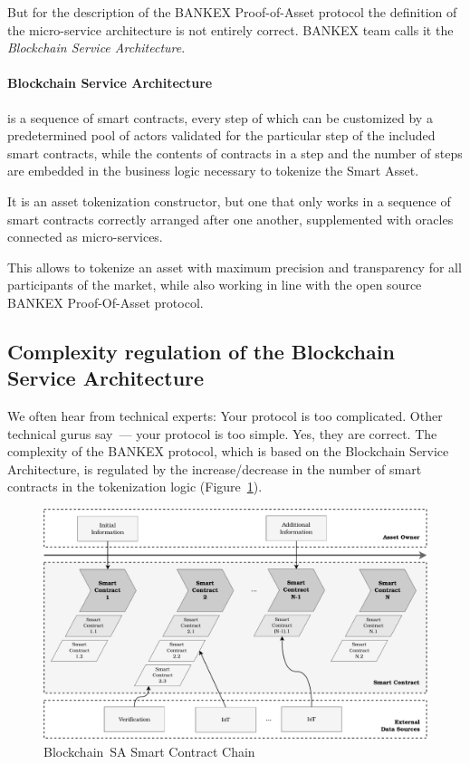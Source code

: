 \documentclass{article}
\begin{document}
\begin{multicols}{2}
But for the description of the BANKEX Proof-of-Asset protocol the definition of the micro-service architecture is not entirely correct. BANKEX team calls it the \textit{Blockchain Service Architecture}.

\paragraph*{Blockchain Service Architecture} is a sequence of smart contracts, every step of which can be customized by a predetermined pool of actors validated for the particular step of the included smart contracts, while the contents of contracts in a step and the number of steps are embedded in the business logic necessary to tokenize the Smart Asset.

It is an asset tokenization constructor, but one that only works in a sequence of smart contracts correctly arranged after one another, supplemented with oracles connected as micro-services. 

This allows to tokenize an asset with maximum precision and transparency for all participants of the market, while also working in line with the open source BANKEX Proof-Of-Asset protocol. 

\subsection{Complexity regulation of the Blockchain Service Architecture}

We often hear from technical experts: Your protocol is too complicated. Other technical gurus say~--- your protocol is too simple. Yes, they are correct. The complexity of the BANKEX protocol, which is based on the Blockchain Service Architecture, is regulated by the increase/decrease in the number of smart contracts in the tokenization logic (Figure~\ref{fig:smart-asset-contract-chain}).

\begin{figure}
  \centering
  \includegraphics[width=\textwidth]{smart-asset-contract-chain.pdf}
  \caption{Blockchain~SA Smart Contract Chain}
  \label{fig:smart-asset-contract-chain}
\end{figure}


\end{multicols}
\end{document}
